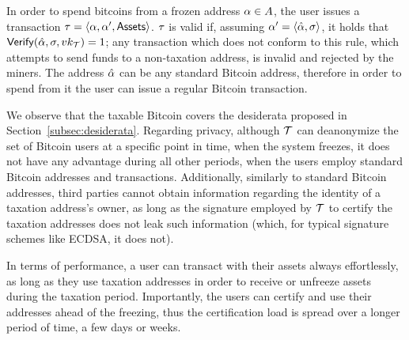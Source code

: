 In order to spend bitcoins from a frozen address $\alpha \in A$, the user
issues a transaction $\tau = \langle \alpha, \alpha', \mathsf{Assets}
\rangle$. $\tau$ is valid if, assuming $\alpha' = \langle
\hat{\alpha}, \sigma \rangle$, it holds that $\mathsf{Verify}(\hat{\alpha}, \sigma,
vk_\mathcal{T}) = 1$; any transaction which does not conform to this rule,
\ie which attempts to send funds to a non-taxation address, is invalid and
rejected by the miners. The address $\hat{\alpha}$ can be any standard
Bitcoin address, therefore in order to spend from it the user can issue a
regular Bitcoin transaction.

We observe that the taxable Bitcoin covers the desiderata proposed in
Section~\ref{subsec:desiderata}. Regarding privacy, although $\mathcal{T}$ can
deanonymize the set of Bitcoin users at a specific point in time, \ie when the
system freezes, it does not have any advantage during all other periods, when
the users employ standard Bitcoin addresses and transactions. Additionally,
similarly to standard Bitcoin addresses, third parties cannot obtain
information regarding the identity of a taxation address's owner, as long as
the signature employed by $\mathcal{T}$ to certify the taxation addresses does not
leak such information (which, for typical signature schemes like ECDSA, it does
not).

In terms of performance, a user can transact with their assets always
effortlessly, as long as they use taxation addresses in order to receive or
unfreeze assets during the taxation period. Importantly, the users can certify
and use their addresses ahead of the freezing, thus the certification load is
spread over a longer period of time, \eg a few days or weeks.

